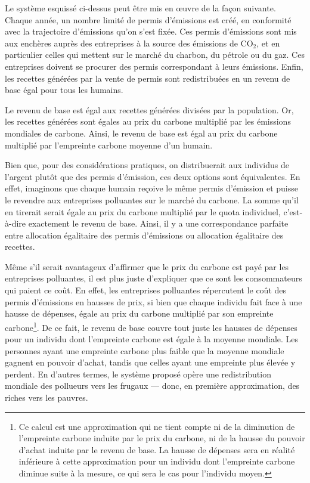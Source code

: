\documentclass[a5paper,french]{memoir}
\begin{document}
Le système esquissé ci-dessus peut être mis en œuvre de la façon suivante. Chaque année, un nombre limité de permis d'émissions est créé, en conformité avec la trajectoire d'émissions qu'on s'est fixée. Ces permis d'émissions sont mis aux enchères auprès des entreprises à la source des émissions de CO$_\text{2}$, et en particulier celles qui mettent sur le marché %
du charbon, du pétrole ou du gaz. Ces entreprises doivent se procurer des permis correspondant à leurs émissions. Enfin, les recettes générées par la vente de permis sont redistribuées en un revenu de base égal pour tous les humains. 

Le revenu de base est égal aux recettes générées divisées par la population. Or, les recettes générées sont égales au prix du carbone multiplié par les émissions mondiales de carbone. Ainsi, le revenu de base est égal au prix du carbone multiplié par l'empreinte carbone moyenne d'un humain. 

Bien que, pour des considérations pratiques, on distribuerait aux individus de l'argent plutôt que des permis d'émission, ces deux options sont équivalentes. En effet, imaginons que chaque humain reçoive le même permis d'émission et puisse le revendre aux entreprises polluantes sur le marché du carbone. La somme qu'il en tirerait serait égale au prix du carbone multiplié par le quota individuel, c'est-à-dire exactement le revenu de base. Ainsi, il y a une correspondance parfaite entre allocation égalitaire des permis d'émissions ou allocation égalitaire des recettes.

Même s'il serait avantageux %
d'affirmer que le prix du carbone est payé par les entreprises polluantes, il est plus juste d'expliquer que ce sont les consommateurs qui paient ce coût. En effet, les entreprises polluantes répercutent le coût des permis d'émissions en hausses de prix, si bien que chaque individu fait face à une hausse de dépenses, égale au prix du carbone multiplié par son empreinte carbone\footnote{Ce calcul est une approximation qui ne tient compte ni de la diminution de l'empreinte carbone induite par le prix du carbone, ni de la hausse du pouvoir d'achat induite par le revenu de base. La hausse de dépenses sera en réalité inférieure à cette approximation pour un individu dont l'empreinte carbone diminue suite à la mesure, ce qui sera le cas pour l'individu moyen.}. De ce fait, le revenu de base couvre tout juste les hausses de dépenses pour un individu dont l'empreinte carbone est égale à la moyenne mondiale. Les personnes ayant une empreinte carbone plus faible que la moyenne mondiale gagnent en pouvoir d'achat, tandis que celles ayant une empreinte plus élevée y perdent. En d'autres termes, le système proposé opère une redistribution mondiale des pollueurs vers les frugaux --- donc, en première approximation, des riches vers les pauvres.
\end{document}
